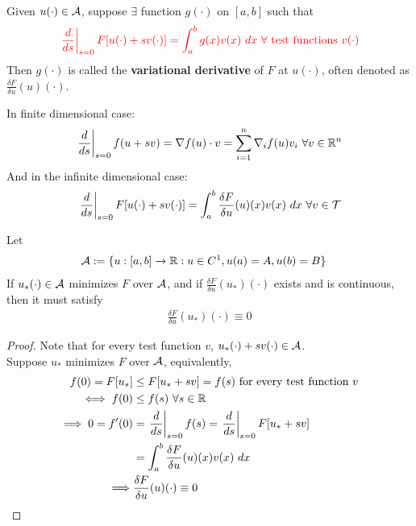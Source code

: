 \documentclass{article}
\begin{document}
	\begin{definition}
		Given $u(\cdot) \in \mathcal{{A}}$, suppose $\exists$ function $g(\cdot)$ on $[a, b]$ such that 
		\begin{align}
			\textcolor{red}{\left. \frac{d}{ds} \right |_{s=0} F[u(\cdot) + sv(\cdot)] = \int_a^b g(x) v(x)\ dx\ \forall \text{{ test functions }} v(\cdot)}
		\end{align}
		Then $g(\cdot)$ is called the \textbf{variational derivative} of $F$ at $u(\cdot)$, often denoted as $\frac{\delta F}{\delta u}(u)(\cdot)$.
	\end{definition}
	
	\begin{remark}
		In finite dimensional case:
		\begin{align}
			\left. \frac{d}{ds} \right |_{s=0} f(u + sv) = \nabla f(u) \cdot v = \sum_{i=1}^n \nabla_i f(u) v_i\ \forall v \in \mathbb{R}^n
		\end{align}
		And in the infinite dimensional case:
		\begin{align}
			\left. \frac{d}{ds} \right |_{s=0} F[u(\cdot) + s v(\cdot)] = \int_a^b \frac{\delta F}{\delta u}(u)(x) v(x)\ dx\ \forall v \in \mathcal{{T}}
		\end{align}
	\end{remark}
	
	\begin{lemma}
		Let 
		\begin{align}
			\mathcal{{A}} &:=\{u:[a, b] \to \mathbb{R}:u \in C^1, u(a) = A, u(b) = B\}
		\end{align}
		If $u_*(\cdot) \in \mathcal{{A}}$ minimizes $F$ over $\mathcal{{A}}$, and if $\frac{\delta F}{\delta u}(u_*)(\cdot)$ exists and is continuous, then it must satisfy
		\begin{align}
			\frac{\delta F}{\delta u}(u_*)(\cdot) \equiv 0
		\end{align}
	\end{lemma}
	
	\begin{proof}
		Note that for every test function $v$, $u_*(\cdot) + s v(\cdot) \in \mathcal{{A}}$. \\
		Suppose $u_*$ minimizes $F$ over $\mathcal{{A}}$, equivalently,
		\begin{align}
			f(0) = F[u_*] &\leq F[u_* + sv] = f(s) \text{{ for every test function $v$}} \\
			\iff f(0) &\leq f(s)\ \forall s \in \mathbb{R} \\
			\implies 0 = f'(0) 
			&= \left. \frac{d}{ds} \right |_{s=0} f(s)
			= \left. \frac{d}{ds} \right |_{s=0} F[u_* + sv] \\
			&= \int_a^b \frac{\delta F}{\delta u}(u)(x)v(x)\ dx \\
			\implies &\frac{\delta F}{\delta u}(u)(\cdot) \equiv 0
		\end{align}
	\end{proof}
	
\end{document}
